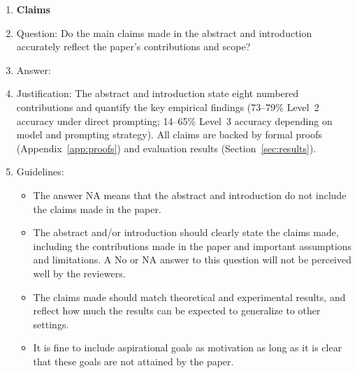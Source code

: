 \documentclass{article}
\theoremstyle{definition}
\begin{document}
\begin{enumerate}

\item {\bf Claims}
    \item[] Question: Do the main claims made in the abstract and introduction accurately reflect the paper's contributions and scope?
    \item[] Answer: \answerYes{}
    \item[] Justification: The abstract and introduction state eight numbered contributions and quantify the key empirical findings (73--79\% Level~2 accuracy under direct prompting; 14--65\% Level~3 accuracy depending on model and prompting strategy). All claims are backed by formal proofs (Appendix~\ref{app:proofs}) and evaluation results (Section~\ref{sec:results}).
    \item[] Guidelines:
    \begin{itemize}
        \item The answer NA means that the abstract and introduction do not include the claims made in the paper.
        \item The abstract and/or introduction should clearly state the claims made, including the contributions made in the paper and important assumptions and limitations. A No or NA answer to this question will not be perceived well by the reviewers. 
        \item The claims made should match theoretical and experimental results, and reflect how much the results can be expected to generalize to other settings. 
        \item It is fine to include aspirational goals as motivation as long as it is clear that these goals are not attained by the paper. 
    \end{itemize}


\end{enumerate}
\end{document}
